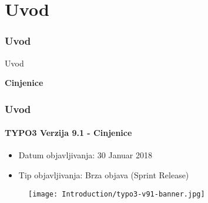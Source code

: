 %

\section{Uvod}
\begin{frame}[fragile]
	\frametitle{Uvod}

	\begin{center}\huge{Uvod}\end{center}
	\begin{center}\huge{\color{typo3darkgrey}\textbf{Cinjenice}}\end{center}

\end{frame}

\begin{frame}[fragile]
	\frametitle{Uvod}
	\framesubtitle{TYPO3 Verzija 9.1 - Cinjenice}

	\begin{itemize}
		\item Datum objavljivanja: 30 Januar 2018
		\item Tip objavljivanja: Brza objava (Sprint Release)
	\end{itemize}

	\begin{figure}
		\texttt{[image: Introduction/typo3-v91-banner.jpg]}
	\end{figure}

\end{frame}

